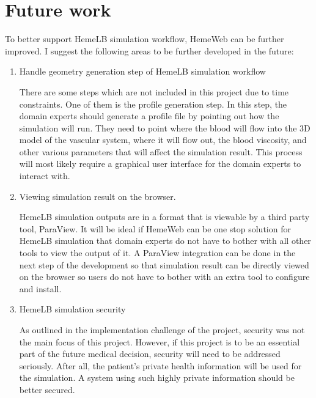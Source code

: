  

\chapter[Future work]{Future work}

To better support HemeLB simulation workflow, HemeWeb can be further improved. I suggest the following areas to be further developed in the future:

\begin{enumerate}
    \item Handle geometry generation step of HemeLB simulation workflow
    
    There are some steps which are not included in this project due to time constraints. One of them is the profile generation step. In this step, the domain experts should generate a profile file by pointing out how the simulation will run. They need to point where the blood will flow into the 3D  model of the vascular system, where it will flow out, the blood viscosity, and other various parameters that will affect the simulation result. This process will most likely require a graphical user interface for the domain experts to interact with.
    
    \item Viewing simulation result on the browser.
    
    HemeLB simulation outputs are  in a format that is viewable by a third party tool, ParaView. It will be ideal if HemeWeb can be one stop solution for HemeLB simulation that domain experts do not have to bother with all other tools to view the output of it. A ParaView integration can be done in the next step of the development so that simulation result can be directly viewed on the browser so users do not have to bother with an extra tool to configure and install.
    
    \item HemeLB simulation security
    
    As outlined in the implementation challenge of the project, security was not the main focus of this project. However, if this project is to be an essential part of the future medical decision, security will need to be addressed seriously. After all, the patient's private health information will be used for the simulation. A system using such highly private information should be better secured.


\end{enumerate}
